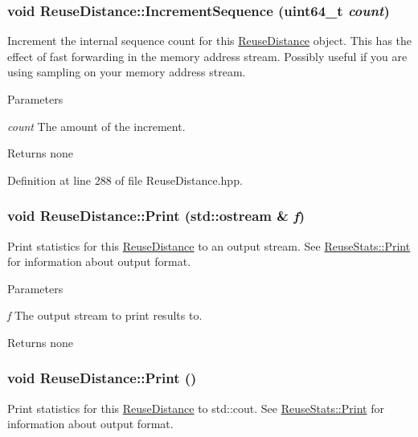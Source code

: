 \hypertarget{class_reuse_distance_a0c6e2709575d716c1ac659a266164163}{
\subsubsection[{IncrementSequence}]{\setlength{\rightskip}{0pt plus 5cm}void ReuseDistance::IncrementSequence (uint64\_\-t {\em count})}}
\label{class_reuse_distance_a0c6e2709575d716c1ac659a266164163}
Increment the internal sequence count for this \hyperlink{class_reuse_distance}{ReuseDistance} object. This has the effect of fast forwarding in the memory address stream. Possibly useful if you are using sampling on your memory address stream.


\begin{DoxyParams}{Parameters}
\item[{\em count}]The amount of the increment.\end{DoxyParams}
\begin{DoxyReturn}{Returns}
none 
\end{DoxyReturn}


Definition at line 288 of file ReuseDistance.hpp.

\hypertarget{class_reuse_distance_ac798c03bb891a51a6648df4b49e25212}{
\subsubsection[{Print}]{\setlength{\rightskip}{0pt plus 5cm}void ReuseDistance::Print (std::ostream \& {\em f})}}
\label{class_reuse_distance_ac798c03bb891a51a6648df4b49e25212}
Print statistics for this \hyperlink{class_reuse_distance}{ReuseDistance} to an output stream. See \hyperlink{class_reuse_stats_a9edd9703b7de1998042cd5f72056d68a}{ReuseStats::Print} for information about output format.


\begin{DoxyParams}{Parameters}
\item[{\em f}]The output stream to print results to.\end{DoxyParams}
\begin{DoxyReturn}{Returns}
none 
\end{DoxyReturn}
\hypertarget{class_reuse_distance_a0cbab308f0c9262e570b994beac0544a}{
\subsubsection[{Print}]{\setlength{\rightskip}{0pt plus 5cm}void ReuseDistance::Print ()}}
\label{class_reuse_distance_a0cbab308f0c9262e570b994beac0544a}
Print statistics for this \hyperlink{class_reuse_distance}{ReuseDistance} to std::cout. See \hyperlink{class_reuse_stats_a9edd9703b7de1998042cd5f72056d68a}{ReuseStats::Print} for information about output format.

